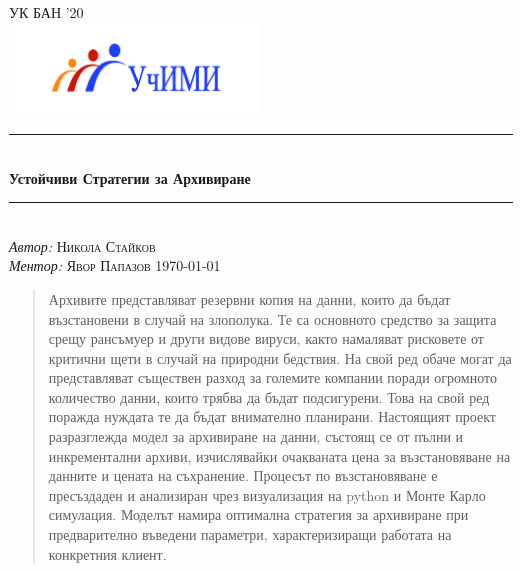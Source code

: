 \documentclass[11pt, a4paper]{article}
\theoremstyle{definition}
\begin{document}
\begin{titlepage}
	\newcommand{\HRule}{\rule{\linewidth}{0.5mm}}
	\centering
	\textsc{\LARGE УК БАН '20}\\
	\includegraphics[width=0.5\textwidth]{Uchimi_logo}\\
	\HRule\\[1 cm]
	{\huge\bfseries Устойчиви Стратегии за Архивиране}\\[1 cm]
	\HRule\\
	\vfill
			\Large
			\textit{Автор:}
			 \textsc{Никола Стайков}\\
             \vspace{2cm}
			\Large
			\textit{Ментор:}
            \textsc{Явор Папазов}
    \vfill	
	{\large\today}   
	\vfill
\end{titlepage}

\tableofcontents
\newpage
\begin{abstract}
		Архивите представляват резервни копия на данни, които да бъдат възстановени в случай на злополука. Те са основното средство за защита срещу рансъмуер и други видове вируси, както намаляват рисковете от критични щети в случай на природни бедствия. На свой ред обаче могат да представляват съществен разход за големите компании поради огромното количество данни, които трябва да бъдат подсигурени. Това на свой ред поражда нуждата те да бъдат внимателно планирани. Настоящият проект разразглежда модел за архивиране на данни, състоящ се от пълни и инкрементални архиви, изчислявайки очакваната цена за възстановяване на данните и цената на съхранение. Процесът по възстановяване е пресъздаден и анализиран чрез визуализация на python и Монте Карло симулация. Моделът намира оптимална стратегия за архивиране при предварително въведени параметри, характеризиращи работата на конкретния клиент.
\end{abstract}
\end{document}
